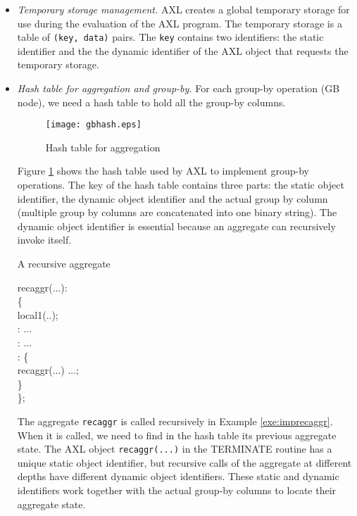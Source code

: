 \begin{itemize}
\item {\it Temporary storage management.} AXL creates a global
  temporary storage for use during the evaluation of the AXL program.
  The temporary storage is a table of {\tt (key, data)} pairs. The
  {\tt key} contains two identifiers: the static identifier and the
  the dynamic identifier of the AXL object that requests the temporary
  storage.
\item {\it Hash table for aggregation and group-by.} For each group-by
  operation (GB node), we need a hash table to hold all the group-by
  columns.

\begin{figure}[!htb]
\centering
\texttt{[image: gbhash.eps]}
\caption{Hash table for aggregation}
\label{fig:gbhash}
\end{figure}

Figure \ref{fig:gbhash} shows the hash table used by AXL to implement
group-by operations. The key of the hash table contains three parts:
the static object identifier, the dynamic object identifier and the
actual group by column (multiple group by columns are concatenated
into one binary string). The dynamic object identifier is essential
because an aggregate can recursively invoke itself.

\begin{example}{A recursive aggregate}
{\footnotesize
\begin{codedisplay}
 recaggr(...): \\
\{\\
\> local1(..);\\
\>: ...\\
\>: ...\\
\>: \{\\
\>\> recaggr(...)  ...;\\
\>\}\\
\};
\end{codedisplay}
}
\label{exe:imprecaggr}
\end{example}

The aggregate {\tt recaggr} is called recursively in Example
\ref{exe:imprecaggr}. When it is called, we need to find in the hash
table its previous aggregate state. The AXL object {\tt recaggr(...)}
in the TERMINATE routine has a unique static object identifier, but
recursive calls of the aggregate at different depths have different
dynamic object identifiers. These static and dynamic identifiers work
together with the actual group-by columns to locate their aggregate
state.


\end{itemize}

